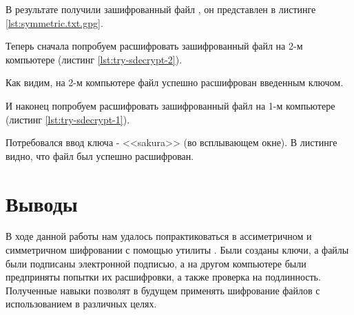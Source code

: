 

В результате получили зашифрованный файл , он представлен в листинге \ref{lst:symmetric.txt.gpg}.



Теперь сначала попробуем расшифровать зашифрованный файл на 2-м компьютере (листинг \ref{lst:try-sdecrypt-2}).



Как видим, на 2-м компьютере файл успешно расшифрован введенным ключом.

И наконец попробуем расшифровать зашифрованный файл на 1-м компьютере (листинг \ref{lst:try-sdecrypt-1}).



Потребовался ввод ключа - <<sakura>> (во всплывающем окне). В листинге видно, что файл был успешно расшифрован.


\section*{Выводы}

В ходе данной работы нам удалось попрактиковаться в ассиметричном и симметричном шифровании с помощью утилиты . Были созданы  ключи, а файлы были подписаны электронной подписью, а на другом компьютере были предприняты попытки их расшифровки, а также проверка на подлинность. 
Полученные навыки позволят в будущем применять шифрование файлов с использованием  в различных целях.


